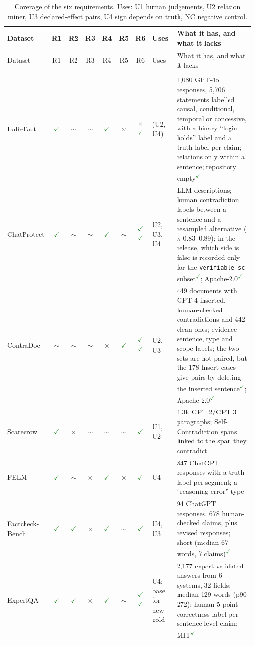 \documentclass[10pt]{article}
\newcommand{\Y}{\textcolor{ForestGreen}{\ensuremath{\checkmark}}}
\newcommand{\Pa}{\textcolor{Dandelion!85!black}{\ensuremath{\sim}}}
\newcommand{\N}{\textcolor{BrickRed}{\ensuremath{\times}}}
\newcommand{\ok}{\textsuperscript{\textcolor{ForestGreen}{\ensuremath{\checkmark}}}}
\begin{document}
{\small
\setlength{\tabcolsep}{3pt}
\begin{longtable}{@{}L{3.25cm}CCCCCCL{1.35cm}L{5.85cm}@{}}
\caption{Coverage of the six requirements. Uses: U1 human judgements, U2 relation miner, U3
declared-effect pairs, U4 sign depends on truth, NC negative control.}\label{tab:coverage}\\
\toprule
Dataset & R1 & R2 & R3 & R4 & R5 & R6 & Uses & What it has, and what it lacks \\
\midrule
\endfirsthead
\toprule
Dataset & R1 & R2 & R3 & R4 & R5 & R6 & Uses & What it has, and what it lacks \\
\midrule
\endhead
\bottomrule
\endfoot
{}\\
LoReFact \citep{lorefact} & \Y & \Pa & \Pa & \Y & \N & \N\ok & (U2, U4) & 1{,}080 GPT-4o responses, 5{,}706 statements labelled causal, conditional, temporal or concessive, with a binary ``logic holds'' label and a truth label per claim; relations only within a sentence; repository empty\ok \\
ChatProtect \citep{mundler2024} & \Y & \Pa & \Pa & \Y & \Pa & \Y\ok & U2, U3, U4 & LLM descriptions; human contradiction labels between a sentence and a resampled alternative ($\kappa$ 0.83--0.89); in the release, which side is false is recorded only for the \texttt{verifiable\_sc} subset\ok; Apache-2.0\ok \\
ContraDoc \citep{contradoc} & \Pa & \Pa & \Pa & \N & \Y & \Y\ok & U2, U3 & 449 documents with GPT-4-inserted, human-checked contradictions and 442 clean ones; evidence sentence, type and scope labels; the two sets are not paired, but the 178 Insert cases give pairs by deleting the inserted sentence\ok; Apache-2.0\ok \\
Scarecrow \citep{scarecrow} & \Y & \N & \Pa & \Pa & \Pa & \Y & U1, U2 & 1.3k GPT-2/GPT-3 paragraphs; Self-Contradiction spans linked to the span they contradict \\
FELM \citep{felm} & \Y & \Pa & \N & \Y & \N & \Y & U4 & 847 ChatGPT responses with a truth label per segment; a ``reasoning error'' type \\
Factcheck-Bench \citep{factcheckbench} & \Y & \Y & \N & \Y & \Pa & \Y & U4, U3 & 94 ChatGPT responses, 678 human-checked claims, plus revised responses; short (median 67 words, 7 claims)\ok \\
ExpertQA \citep{expertqa} & \Y & \Y & \N & \Y & \Pa & \Y\ok & U4; base for new gold & 2{,}177 expert-validated answers from 6 systems, 32 fields; median 129 words (p90 272); human 5-point correctness label per sentence-level claim; MIT\ok \\

\end{longtable}}
\end{document}

